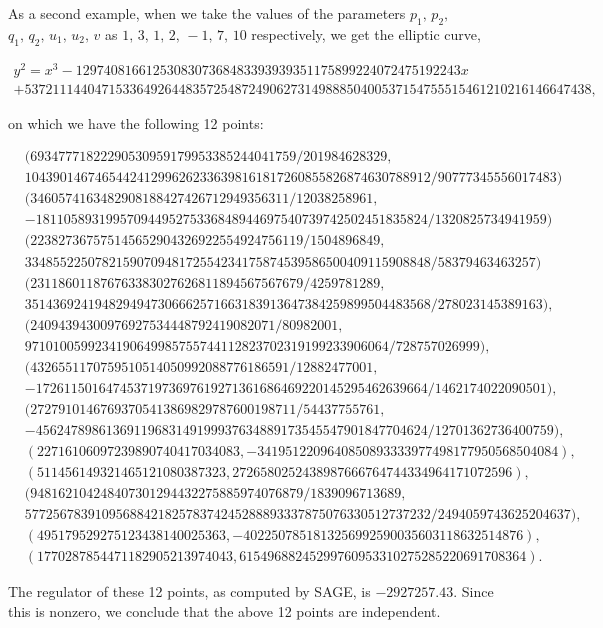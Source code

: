 \documentclass[11pt, leqno]{article}
\begin{document}
 

As a second example, when we take the values of the parameters $p_1,\,p_2,$ $q_1,\,q_2,\,u_1,\,u_2,\,v$  as $1,\,3,\,1,\,2,\,-1,\,7,\,10$ respectively, we get the    elliptic curve, 
\begin{scriptsize}
\begin{multline} 
y^2 = x^3-1297408166125308307368483393939351175899224072475192243x\\+537211144047153364926448357254872490627314988850400537154755515461210216146647438,
\end{multline}
\end{scriptsize}
on which we have the following 12 points:
\begin{scriptsize}
\begin{align*}
&(69347771822290530959179953385244041759/201984628329,\\
& 1043901467465442412996262336398161817260855826874630788912/90777345556017483)\\
&(3460574163482908188427426712949356311/12038258961, \\
&-18110589319957094495275336848944697540739742502451835824/1320825734941959)\\
&(223827367575145652904326922554924756119/1504896849,\\
& 3348552250782159070948172554234175874539586500409115908848/58379463463257)\\
&(231186011876763383027626811894567567679/4259781289,\\
&3514369241948294947306662571663183913647384259899504483568/278023145389163),\\
&(24094394300976927534448792419082071/80982001, \\
&9710100599234190649985755744112823702319199233906064/728757026999),\\
&(4326551170759510514050992088776186591/12882477001, \\
&-17261150164745371973697619271361686469220145295462639664/1462174022090501),\\
&(27279101467693705413869829787600198711/54437755761, \\
&-45624789861369119683149199937634889173545547901847704624/12701362736400759),\\
&(22716106097239890740417034083, -3419512209640850893333977498177950568504084),\\
&(511456149321465121080387323, 2726580252438987666764744334964171072596),\\
&(948162104248407301294432275885974076879/1839096713689,\\
& 5772567839109568842182578374245288893337875076330512737232/2494059743625204637),\\
&(495179529275123438140025363, -4022507851813256992590035603118632514876),\\
&(1770287854471182905213974043, 61549688245299760953310275285220691708364).
\end{align*}
\end{scriptsize}
The regulator of these 12 points, as computed by SAGE, is $-2927257.43$. Since this is nonzero, we conclude that the above 12 points are independent.
 
\end{document}

